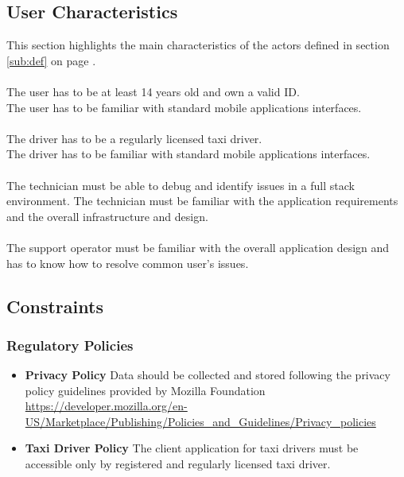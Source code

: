 \subsection{User Characteristics} 
\label{sub:user_characteristics}
This section highlights the main characteristics of the actors defined in section \ref{sub:def} on page \pageref{sub:def}.

\paragraph{} The user has to be at least 14 years old and own a valid ID.\\ 
The user has to be familiar with standard mobile applications interfaces.
\paragraph{} The driver has to be a regularly licensed taxi driver.\\ The driver has to be familiar with standard mobile applications interfaces.
\paragraph{} 
The technician must be able to debug and identify issues in a full stack environment. The technician must be familiar with the application requirements and the overall infrastructure and design.
\paragraph{}  The support operator must be familiar with the overall application design and has to know how to resolve common user's issues.

\subsection{Constraints} 
\label{sub:constraints}

\subsubsection{Regulatory Policies} 
\label{ssub:regulatory_policies}
\begin{itemize}
	\item \textbf{Privacy Policy} Data should be collected and stored following the privacy policy guidelines provided by Mozilla Foundation \url{https://developer.mozilla.org/en-US/Marketplace/Publishing/Policies_and_Guidelines/Privacy_policies}
	\item \textbf{Taxi Driver Policy} The client application for taxi drivers must be accessible only by registered and regularly licensed taxi driver.
\end{itemize}

